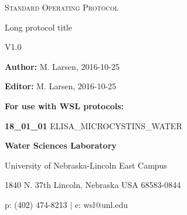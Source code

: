 \documentclass[12pt,letterpaper,titlepage,twoside,onecolumn]{article}
\begin{document}
		\textsc{Standard Operating Protocol}
		\vspace{50mm}
		
		\Huge{Long protocol title}
		\vspace{5mm}
		
		\normalsize{V1.0}
		\vspace{15mm}
		
		\textbf{Author:} M. Larsen, 2016-10-25
		
		\textbf{Editor:} M. Larsen, 2016-10-25
		
		\vspace{25mm}
		
		\textbf{For use with WSL protocols:}
		\vspace{3mm}
		
		\textbf{18\_01\_01} ELISA\_MICROCYSTINS\_WATER
		
		\vspace{65mm}
		\textbf{Water Sciences Laboratory}
		
		\small{University of Nebraska-Lincoln East Campus}
		
		\small{1840 N. 37th Lincoln, Nebraska USA 68583-0844}
		
		\small{p: (402) 474-8213 $\vert$ e: wsl@unl.edu}
		
\end{document}
